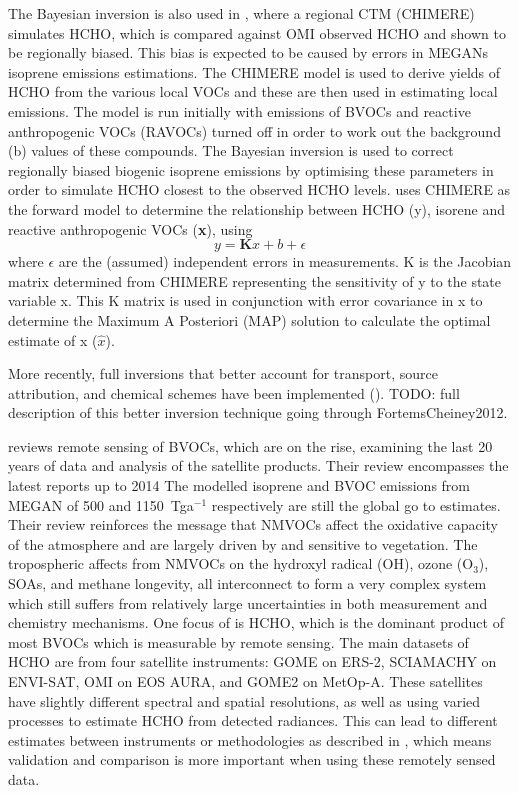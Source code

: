     The Bayesian inversion is also used in \cite{Curci2010}, where a regional CTM (CHIMERE) simulates HCHO, which is compared against OMI observed HCHO and shown to be regionally biased.
    This bias is expected to be caused by errors in MEGANs isoprene emissions estimations.
    The CHIMERE model is used to derive yields of HCHO from the various local VOCs and these are then used in estimating local emissions.
    The model is run initially with emissions of BVOCs and reactive anthropogenic VOCs (RAVOCs) turned off in order to work out the background (b) values of these compounds.
    The Bayesian inversion is used to correct regionally biased biogenic isoprene emissions by optimising these parameters in order to simulate HCHO closest to the observed HCHO levels.
    \cite{Curci2010} uses CHIMERE as the forward model to determine the relationship between HCHO (y), isorene and reactive anthropogenic VOCs (\textbf{x}), using 
    \begin{equation}
    y=\mathbf{K}x + b + \epsilon
    \end{equation}
    where $\epsilon$ are the (assumed) independent errors in measurements.
    K is the Jacobian matrix determined from CHIMERE representing the sensitivity of y to the state variable x.
    This K matrix is used in conjunction with error covariance in x to determine the Maximum A Posteriori (MAP) solution to calculate the optimal estimate of x ($\hat{x}$).
    
    
    More recently, full inversions that better account for transport, source attribution, and chemical schemes have been implemented (\cite{FortemsCheiney2012}).
    TODO: full description of this better inversion technique going through FortemsCheiney2012.
    
    
    \cite{Kefauver2014} reviews remote sensing of BVOCs, which are on the rise, examining the last 20 years of data and analysis of the satellite products.
    Their review encompasses the latest reports up to 2014
    The modelled isoprene and BVOC emissions from MEGAN \citep{Guenther2000} of 500 and 1150~Tga$^{-1}$ respectively are still the global go to estimates.
    Their review reinforces the message that NMVOCs affect the oxidative capacity of the atmosphere and are largely driven by and sensitive to vegetation.
    The tropospheric affects from NMVOCs on the hydroxyl radical (OH), ozone (O$_3$), SOAs, and methane longevity, all interconnect to form a very complex system which still suffers from relatively large uncertainties in both measurement and chemistry mechanisms.
    One focus of \cite{Kefauver2014} is HCHO, which is the dominant product of most BVOCs which is measurable by remote sensing.
    The main datasets of HCHO are from four satellite instruments: GOME on ERS-2, SCIAMACHY on ENVI-SAT, OMI on EOS AURA, and GOME2 on MetOp-A.
    These satellites have slightly different spectral and spatial resolutions, as well as using varied processes to estimate HCHO from detected radiances.
    This can lead to different estimates between instruments or methodologies as described in \cite{Lorent2017}, which means validation and comparison is more important when using these remotely sensed data.
    
